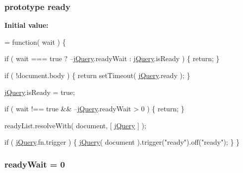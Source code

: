 \hypertarget{jquery-1_810_82-vsdoc_8js_afcf7497803a32ea161cd2c7c5345c0ec}{
\subsubsection[{ready}]{ {\bf prototype} ready}}\label{jquery-1_810_82-vsdoc_8js_afcf7497803a32ea161cd2c7c5345c0ec}
{\bfseries Initial value\-:}
\begin{DoxyCode}
= \textcolor{keyword}{function}( wait ) \{


        
        \textcolor{keywordflow}{if} ( wait === \textcolor{keyword}{true} ? --\hyperlink{jquery-1_810_82-vsdoc_8js_add5237586d970a38a81f990e8eb28c6c}{jQuery}.readyWait : \hyperlink{jquery-1_810_82-vsdoc_8js_add5237586d970a38a81f990e8eb28c6c}{jQuery}.isReady ) \{
            \textcolor{keywordflow}{return};
        \}

        
        \textcolor{keywordflow}{if} ( !document.body ) \{
            \textcolor{keywordflow}{return} setTimeout( \hyperlink{jquery-1_810_82-vsdoc_8js_add5237586d970a38a81f990e8eb28c6c}{jQuery}.ready );
        \}

        
        \hyperlink{jquery-1_810_82-vsdoc_8js_add5237586d970a38a81f990e8eb28c6c}{jQuery}.isReady = \textcolor{keyword}{true};

        
        \textcolor{keywordflow}{if} ( wait !== \textcolor{keyword}{true} && --\hyperlink{jquery-1_810_82-vsdoc_8js_add5237586d970a38a81f990e8eb28c6c}{jQuery}.readyWait > 0 ) \{
            \textcolor{keywordflow}{return};
        \}

        
        readyList.resolveWith( document, [ \hyperlink{jquery-1_810_82-vsdoc_8js_add5237586d970a38a81f990e8eb28c6c}{jQuery} ] );

        
        \textcolor{keywordflow}{if} ( \hyperlink{jquery-1_810_82-vsdoc_8js_add5237586d970a38a81f990e8eb28c6c}{jQuery}.fn.trigger ) \{
            \hyperlink{jquery-1_810_82-vsdoc_8js_add5237586d970a38a81f990e8eb28c6c}{jQuery}( document ).trigger(\textcolor{stringliteral}{"ready"}).off(\textcolor{stringliteral}{"ready"});
        \}
    \}
\end{DoxyCode}
\hypertarget{jquery-1_810_82-vsdoc_8js_aeb394066cf5f3ce501b86e49d9f68da7}{
\subsubsection[{ready\-Wait}]{ ready\-Wait = 0}}\label{jquery-1_810_82-vsdoc_8js_aeb394066cf5f3ce501b86e49d9f68da7}
